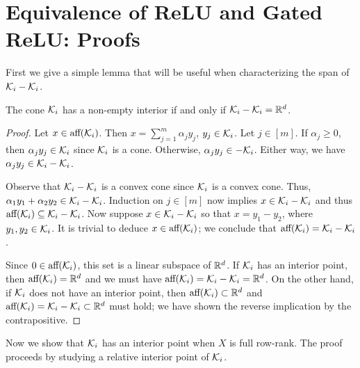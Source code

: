 
\section{Equivalence of ReLU and Gated ReLU: Proofs}\label{app:relu-grelu-equivalence}

First we give a simple lemma that will be useful when characterizing the span of \( \mathcal{K}_i - \mathcal{K}_i \).

\begin{lemma}\label{lemma:affine-characterization}
    The cone \( \mathcal{K}_i \) has a non-empty interior if and only if \( \mathcal{K}_i - \mathcal{K}_i = \mathbb{R}^d \).
\end{lemma}
\begin{proof}
    Let \( x \in \text{aff} (\mathcal{K}_i) \).
    Then \( x = \sum_{j=1}^m \alpha_j y_j \), \( y_j \in \mathcal{K}_i \).
    Let \( j \in [m] \).
    If \( \alpha_j \geq 0 \), then \( \alpha_j y_j \in \mathcal{K}_i \) since \( \mathcal{K}_i \) is a cone.
    Otherwise, \( \alpha_j y_j \in - \mathcal{K}_i \).
    Either way, we have \( \alpha_j y_j \in \mathcal{K}_i - \mathcal{K}_i \).

    Observe that \( \mathcal{K}_i - \mathcal{K}_i \) is a convex cone since \( \mathcal{K}_i \) is a convex cone.
    Thus, \( \alpha_1 y_1 + \alpha_2 y_2 \in \mathcal{K}_i - \mathcal{K}_i \).
    Induction on \( j \in [m] \) now implies \( x \in \mathcal{K}_i - \mathcal{K}_i \) and thus \( \text{aff} (\mathcal{K}_i) \subseteq \mathcal{K}_i - \mathcal{K}_i \).
    Now suppose \( x \in \mathcal{K}_i - \mathcal{K}_i \) so that \( x = y_1 - y_2 \), where \( y_1, y_2 \in \mathcal{K}_i \).
    It is trivial to deduce \( x \in \text{aff} (\mathcal{K}_i) \);
    we conclude that \( \text{aff} (\mathcal{K}_i) = \mathcal{K}_i - \mathcal{K}_i \).

    Since \( 0 \in \text{aff} (\mathcal{K}_i) \), this set is a linear subspace of \( \mathbb{R}^d \).
    If \( \mathcal{K}_i \) has an interior point, then \( \text{aff} (\mathcal{K}_i) = \mathbb{R}^d \) and we must have \( \text{aff} (\mathcal{K}_i) = \mathcal{K}_i - \mathcal{K}_i = \mathbb{R}^d \).
    On the other hand, if \( \mathcal{K}_i \) does not have an interior point, then \( \text{aff} (\mathcal{K}_i) \subset \mathbb{R}^d \) and \( \text{aff} (\mathcal{K}_i) = \mathcal{K}_i - \mathcal{K}_i \subset \mathbb{R}^d \) must hold;
    we have shown the reverse implication by the contrapositive.
\end{proof}

Now we show that \( \mathcal{K}_i \) has an interior point when \( X \) is full row-rank.
The proof proceeds by studying a relative interior point of \( \mathcal{K}_i \).

